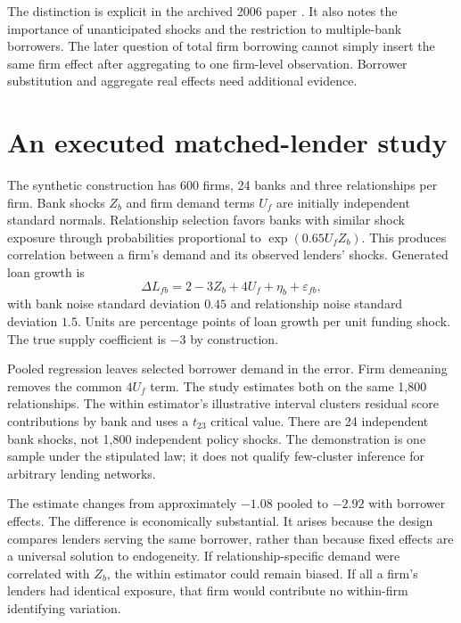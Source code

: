 The distinction is explicit in the archived 2006 paper
\citep[Section III.B, equation 5]{mian2006}. It also notes the importance
of unanticipated shocks and the restriction to multiple-bank borrowers.
The later question of total firm borrowing cannot simply insert the same
firm effect after aggregating to one firm-level observation. Borrower
substitution and aggregate real effects need additional evidence.

\section{An executed matched-lender study}
The synthetic construction has 600 firms, 24 banks and three relationships
per firm. Bank shocks $Z_b$ and firm demand terms $U_f$ are initially
independent standard normals. Relationship selection favors banks with
similar shock exposure through probabilities proportional to
$\exp(0.65U_f Z_b)$. This produces correlation between a firm's demand
and its observed lenders' shocks. Generated loan growth is
\begin{equation}
 \Delta L_{fb}=2-3Z_b+4U_f+\eta_b+\varepsilon_{fb},
 \label{eq:credit-dgp}
\end{equation}
with bank noise standard deviation $0.45$ and relationship noise standard
deviation $1.5$. Units are percentage points of loan growth per unit
funding shock. The true supply coefficient is $-3$ by construction.

Pooled regression leaves selected borrower demand in the error. Firm
demeaning removes the common $4U_f$ term. The study estimates both on
the same 1,800 relationships. The within estimator's illustrative interval
clusters residual score contributions by bank and uses a $t_{23}$
critical value. There are 24 independent bank shocks, not 1,800 independent
policy shocks. The demonstration is one sample under the stipulated law;
it does not qualify few-cluster inference for arbitrary lending networks.

\begin{table}[htbp]\centering\small

\caption{Synthetic matched-bank loan-growth comparison. Relationship
selection biases the pooled association, while borrower effects recover
the stipulated supply coefficient much more closely.}
\label{tab:credit-supply}
\end{table}

The estimate changes from approximately $-1.08$ pooled to $-2.92$ with
borrower effects. The difference is economically substantial. It arises
because the design compares lenders serving the same borrower, rather
than because fixed effects are a universal solution to endogeneity.
If relationship-specific demand were correlated with $Z_b$, the within
estimator could remain biased. If all a firm's lenders had identical
exposure, that firm would contribute no within-firm identifying variation.

